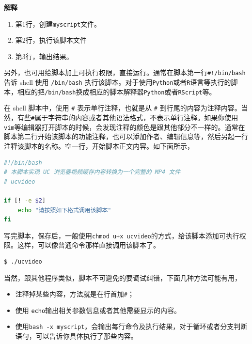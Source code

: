 \documentclass[doctor,openright,twoside]{sjtuthesis}
\providecommand{\tightlist}{%
    \setlength{\itemsep}{0pt}\setlength{\parskip}{0pt}}
\newcommand{\passthrough}[1]{#1}
\theoremstyle{plain}
\theoremstyle{definition}
\theoremstyle{remark}
\theoremstyle{ocrenumbox}
\theoremstyle{plain}
\begin{document}
\lstset{mathescape=false}

\textbf{解释}

\begin{enumerate}
\def\labelenumi{\arabic{enumi}.}
\tightlist
\item
  第1行，创建\passthrough{\lstinline!myscript!}文件。
\item
  第2行，执行该脚本文件
\item
  第3行，输出结果。
\end{enumerate}

另外，也可用给脚本加上可执行权限，直接运行。通常在脚本第一行\passthrough{\lstinline"#!/bin/bash"}告诉
shell 使用 \passthrough{\lstinline!/bin/bash!}
执行该脚本。对于使用\passthrough{\lstinline!Python!}或者\passthrough{\lstinline!R!}语言等执行的脚本，相应的把\passthrough{\lstinline!/bin/bash!}换成相应的脚本解释器\passthrough{\lstinline!Python!}或者\passthrough{\lstinline!RScript!}等。

在 shell 脚本中，使用 \passthrough{\lstinline!#!} 表示单行注释，也就是从
\passthrough{\lstinline!#!}
到行尾的内容为注释内容。当然，有些\passthrough{\lstinline!#!}属于字符串的内容或者其他语法格式，不表示单行注释。如果你使用\passthrough{\lstinline!vim!}等编辑器打开脚本的时候，会发现注释的颜色是跟其他部分不一样的。通常在脚本第二行开始该脚本的功能注释，也可以添加作者、编辑信息等，然后另起一行注释该脚本的名称。空一行，开始脚本正文内容。如下面所示，

\begin{lstlisting}[language=bash]
#!/bin/bash
# 本脚本实现 UC 浏览器视频缓存内容转换为一个完整的 MP4 文件
# ucvideo

if [! -e $2]
    echo "请按照如下格式调用该脚本"
fi
\end{lstlisting}

写完脚本，保存后，一般使用\passthrough{\lstinline!chmod u+x ucvideo!}的方式，给该脚本添加可执行权限。这样，可以像普通命令那样直接调用该脚本了。

\begin{lstlisting}[language=bash]
$ ./ucvideo
\end{lstlisting}

当然，跟其他程序类似，脚本不可避免的要调试纠错，下面几种方法可能有用，

\begin{itemize}
\tightlist
\item
  注释掉某些内容，方法就是在行首加\passthrough{\lstinline!#!}；
\item
  使用
  \passthrough{\lstinline!echo!}输出相关参数信息或者其他需要显示的内容。
\item
  使用\passthrough{\lstinline!bash -x myscript!}，会输出每行命令及执行结果，对于循环或者分支判断语句，可以告诉你具体执行了那些内容。
\end{itemize}
\end{document}
